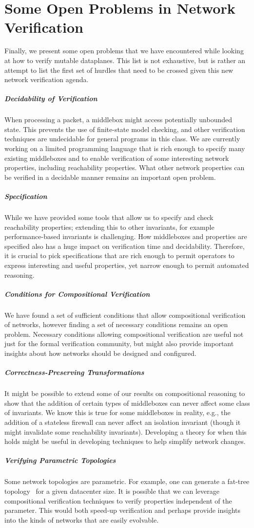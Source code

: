\section{Some Open Problems in Network Verification}
Finally, we present some open problems that we have encountered while looking at how to verify mutable dataplanes. This list is not 
exhaustive, but is rather an attempt to list the first set of hurdles that need to be crossed given this new network verification agenda.

\subparagraph*{Decidability of Verification} When processing a packet, a middlebox might access potentially unbounded state. This prevents the use
of finite-state model checking, and other verification techniques are undecidable for general programs in this class. We are
currently working on a limited programming language that is rich enough to specify many existing middleboxes and to enable verification of some interesting network properties, including reachability properties. What other network properties can be verified in a decidable manner remains an important open problem.

\subparagraph*{Specification} While we have provided some tools
that allow us to specify and check reachability properties; extending this to other invariants, for example performance-based
invariants is challenging. How middleboxes and properties are specified also has a huge impact on verification time and
decidability. Therefore, it is crucial to pick specifications that are rich enough to permit operators to express interesting and
useful properties, yet narrow enough to permit automated reasoning.

\cbstart
\subparagraph*{Conditions for Compositional Verification} We have found a set of sufficient conditions that allow compositional verification of networks, however
finding a set of necessary conditions remains an open problem. Necessary conditions allowing compositional verification are useful not just for the formal verification community, but might also provide important insights about how networks should be designed and configured.
\cbend

\subparagraph*{Correctness-Preserving Transformations} It might be possible to extend some of our results on compositional reasoning to show that the addition of certain types of middleboxes
can never affect some class of invariants. We know this is true for some middleboxes in reality, e.g., the addition of a stateless firewall
can never affect an isolation invariant (though it might invalidate some reachability invariants). Developing a theory for when this 
holds might be useful in developing techniques to help simplify network changes. 

\subparagraph*{Verifying Parametric Topologies} Some network topologies are parametric. For example, one can generate a fat-tree topology~\cite{al2008scalable} for a given datacenter size. It is possible that we can leverage compositional verification techniques to verify properties independent of the parameter. This would both speed-up verification and perhaps provide insights into the kinds of networks that are easily evolvable.